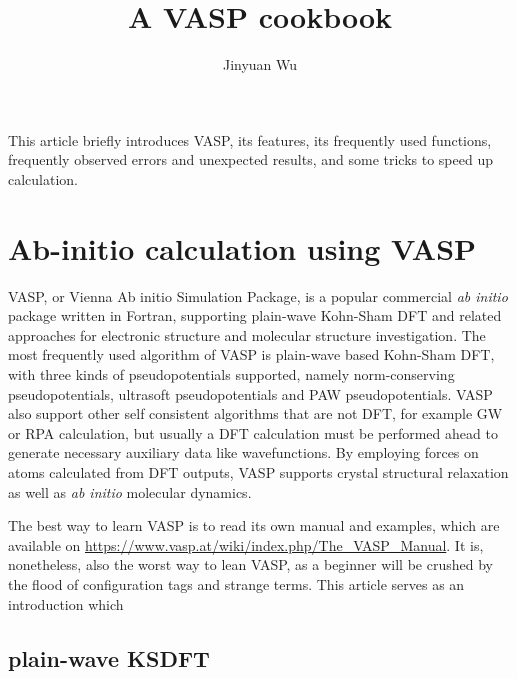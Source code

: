 \documentclass[hyperref, a4paper]{article}
\title{A VASP cookbook}
\author{Jinyuan Wu}
\begin{document}
\maketitle

This article briefly introduces VASP, its features, its frequently used functions, frequently observed errors and unexpected results, and some tricks to speed up calculation.

\section{Ab-initio calculation using VASP}

VASP, or Vienna Ab initio Simulation Package, is a popular commercial \emph{ab initio} package written in Fortran, supporting plain-wave Kohn-Sham DFT and related approaches for electronic structure and molecular structure investigation.
The most frequently used algorithm of VASP is plain-wave based Kohn-Sham DFT, with three kinds of pseudopotentials supported,
namely norm-conserving pseudopotentials, ultrasoft pseudopotentials and PAW pseudopotentials.
VASP also support other self consistent algorithms that are not DFT, for example GW or RPA calculation, but usually a DFT calculation must be performed ahead to generate necessary auxiliary data like wavefunctions.
By employing forces on atoms calculated from DFT outputs, VASP supports crystal structural relaxation as well as \emph{ab initio} molecular dynamics.

The best way to learn VASP is to read its own manual and examples, which are available on \url{https://www.vasp.at/wiki/index.php/The_VASP_Manual}.
It is, nonetheless, also the worst way to lean VASP, as a beginner will be crushed by the flood of configuration tags and strange terms.
This article serves as an introduction which 

\subsection{plain-wave KSDFT}
\end{document}
